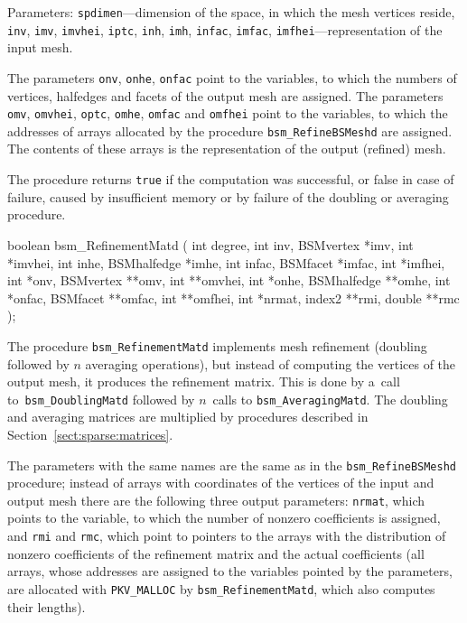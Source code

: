 Parameters: \texttt{spdimen}---dimension of the space, in which the mesh
vertices reside, \texttt{inv}, \texttt{imv}, \texttt{imvhei}, \texttt{iptc},
\texttt{inh}, \texttt{imh}, \texttt{infac}, \texttt{imfac},
\texttt{imfhei}---representation of the input mesh.

The parameters \texttt{onv}, \texttt{onhe}, \texttt{onfac} point to the
variables, to which the numbers of vertices, halfedges and facets of the
output mesh are assigned. The parameters \texttt{omv}, \texttt{omvhei},
\texttt{optc}, \texttt{omhe}, \texttt{omfac} and \texttt{omfhei} point to
the variables, to which the addresses of arrays allocated by the procedure
\texttt{bsm\_RefineBSMeshd} are assigned. The contents of these arrays is
the representation of the output (refined) mesh.

The procedure returns \texttt{true} if the computation was successful, or
false in case of failure, caused by insufficient memory or by failure of the
doubling or averaging procedure.

\medskip
\begin{listingC}
boolean bsm_RefinementMatd ( int degree,
                             int inv, BSMvertex *imv, int *imvhei,
                             int inhe, BSMhalfedge *imhe,
                             int infac, BSMfacet *imfac, int *imfhei,
                             int *onv, BSMvertex **omv, int **omvhei,
                             int *onhe, BSMhalfedge **omhe,
                             int *onfac, BSMfacet **omfac, int **omfhei,
                             int *nrmat, index2 **rmi, double **rmc );  
\end{listingC}
The procedure \texttt{bsm\_RefinementMatd} implements mesh refinement
(doubling followed by $n$ averaging operations), but instead of computing
the vertices of the output mesh, it produces the refinement matrix.
This is done by a~call to~\texttt{bsm\_DoublingMatd} followed by $n$~calls to
\texttt{bsm\_AveragingMatd}. The doubling and averaging matrices are
multiplied by procedures described in Section~\ref{sect:sparse:matrices}.

The parameters with the same names are the same as in the
\texttt{bsm\_RefineBSMeshd} procedure; instead of arrays with coordinates of
the vertices of the input and output mesh there are the following three
output parameters: \texttt{nrmat}, which points to the variable, to which
the number of nonzero coefficients is assigned, and \texttt{rmi} and
\texttt{rmc}, which point to pointers to the arrays with the distribution of
nonzero coefficients of the refinement matrix and the actual coefficients
(all arrays, whose addresses are assigned to the variables pointed by the
parameters, are allocated with \texttt{PKV\_MALLOC} by
\texttt{bsm\_RefinementMatd}, which also computes their lengths).


